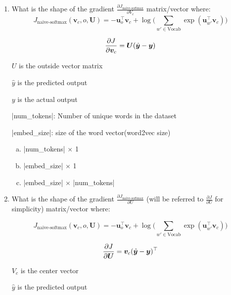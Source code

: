 \begin{enumerate}[1.]

\item {}
What is the shape of the gradient $\frac{\partial J_\text{naive-softmax}}{\partial V_c}$ matrix/vector where:
\begin{equation*} J_{\text{naive-softmax}}(\bm v_c, o, \bm U) = - \bm u_{o}^\top \bm v_c + \log \bigg( \sum_{w' \in \text{Vocab}} \exp(\bm u_{w'}^\top \bm v_c) \bigg) \end{equation*}

\begin{equation*} {\partial J \over \partial \bm v_c} = \bm U(\hat{\bm y} - \bm y)\end{equation*}

$U$ is the outside vector matrix

$\hat{y}$ is the predicted output

$y$ is the actual output

|num_tokens|: Number of unique words in the dataset

|embed_size|: size of the word vector(word2vec size)

\begin{enumerate}[(a)]
\item |num_tokens| $\times$ 1
\item |embed_size| $\times$ 1
\item |embed_size| $\times$ |num_tokens|
\end{enumerate}


\item {}
What is the shape of the gradient $\frac{\partial J_\text{naive-softmax}}{\partial U}$ (will be referred to $\frac{\partial J}{\partial U}$ for simplicity) matrix/vector where:

\begin{equation*} J_{\text{naive-softmax}}(\bm v_c, o, \bm U) = - \bm u_{o}^\top \bm v_c + \log \bigg( \sum_{w' \in \text{Vocab}} \exp(\bm u_{w'}^\top \bm v_c) \bigg) \end{equation*}

\begin{equation*} {\partial J \over \partial \bm U } = {\bm v_c} (\hat{\bm y} - \bm y)^\top \end{equation*}

$V_c$ is the center vector

$\hat{y}$ is the predicted output


\end{enumerate}
